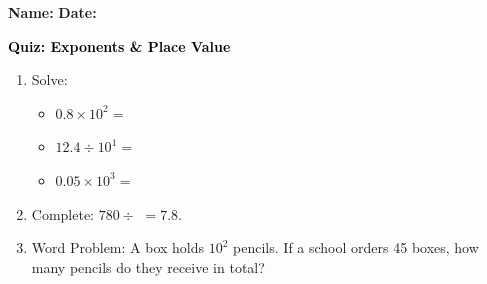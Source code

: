 \documentclass[12pt, letterpaper, fleqn]{article}
\newcommand{\blank}{\underline{\hspace{2.2cm}}}
\begin{document}
\textbf{Name:} \underline{\hspace{5cm}}
\hfill
\textbf{Date:} \underline{\hspace{3cm}}\\

\begin{tcolorbox}[colback=customteal!20]
    \large\textcolor{black}{\textbf{Quiz: Exponents \& Place Value}}
\end{tcolorbox}
\begin{enumerate}[itemsep=3.5cm, leftmargin=0.6cm]
\item Solve:
  \begin{itemize}[itemsep=0.8cm]
    \item $0.8 \times 10^2 =$ \blank
    \item $12.4 \div 10^1 =$ \blank
    \item $0.05 \times 10^3 =$ \blank
  \end{itemize}
\item Complete: $780 \div$ \blank $= 7.8$.
\vspace{3cm}
\item Word Problem: A box holds $10^2$ pencils. If a school orders 45 boxes, how many pencils do they receive in total?
\end{enumerate}
\end{document}
